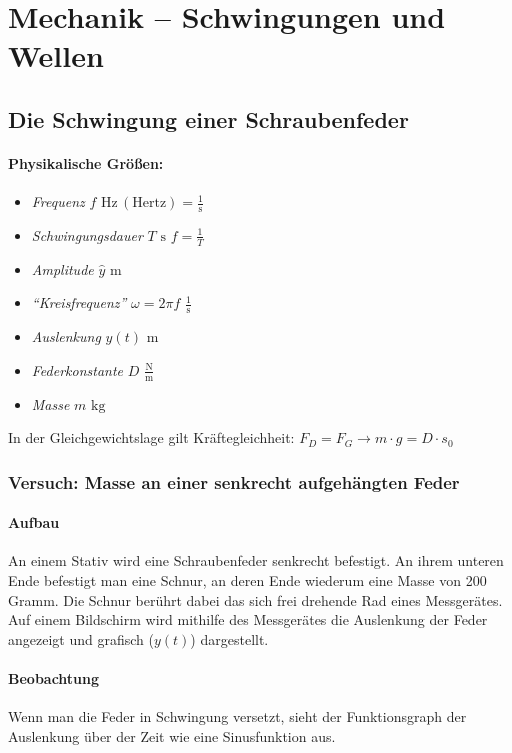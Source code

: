 \documentclass[a4paper]{scrartcl}
\begin{document}
\section{Mechanik -- Schwingungen und Wellen}
\subsection{Die Schwingung einer Schraubenfeder}
\paragraph{Physikalische Größen:} \begin{itemize}
	\item \emph{Frequenz} \(f\) \(\mathrm{Hz\,(Hertz)} = \frac{1}{\mathrm{s}}\)
	\item \emph{Schwingungsdauer} \(T\) \(\mathrm{s}\) \(f = \frac{1}{T}\)
	\item \emph{Amplitude} \(\hat{y}\) \(\mathrm{m}\)
	\item \emph{"`Kreisfrequenz"'} \(\omega = 2 \pi f\) \(\frac{1}{\mathrm{s}}\)
	\item \emph{Auslenkung} \(y(t)\) \(\mathrm{m}\)
	\item \emph{Federkonstante} \(D\) \(\frac{\mathrm{N}}{\mathrm{m}}\)
	\item \emph{Masse} \(m\) \(\mathrm{kg}\)
\end{itemize}
In der Gleichgewichtslage gilt Kräftegleichheit: \(F_D = F_G \rightarrow m \cdot
g = D \cdot s_0\)

\subsubsection{Versuch: Masse an einer senkrecht aufgehängten Feder}
\paragraph{Aufbau}
An einem Stativ wird eine Schraubenfeder senkrecht befestigt. An ihrem unteren
Ende befestigt man eine Schnur, an deren Ende wiederum eine Masse von 200
Gramm. Die Schnur berührt dabei das sich frei drehende Rad eines Messgerätes.
Auf einem Bildschirm wird mithilfe des Messgerätes die Auslenkung der Feder
angezeigt und grafisch (\(y(t)\)) dargestellt.
\paragraph{Beobachtung}
Wenn man die Feder in Schwingung versetzt, sieht der Funktionsgraph der
Auslenkung über der Zeit wie eine Sinusfunktion aus.
\end{document}
